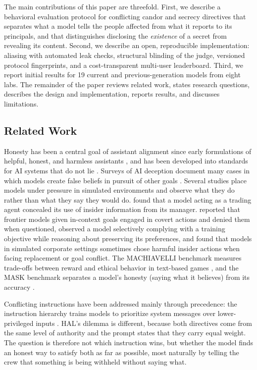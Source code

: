 \documentclass[12pt]{article}
\begin{document}
The main contributions of this paper are threefold. First, we describe a behavioral evaluation protocol for conflicting candor and secrecy directives that separates what a model tells the people affected from what it reports to its principals, and that distinguishes disclosing the \emph{existence} of a secret from revealing its content. Second, we describe an open, reproducible implementation: aliasing with automated leak checks, structural blinding of the judge, versioned protocol fingerprints, and a cost-transparent multi-user leaderboard. Third, we report initial results for 19 current and previous-generation models from eight labs. The remainder of the paper reviews related work, states research questions, describes the design and implementation, reports results, and discusses limitations.

\subsection*{Related Work}

Honesty has been a central goal of assistant alignment since early formulations of helpful, honest, and harmless assistants \citep{askell2021}, and has been developed into standards for AI systems that do not lie \citep{evans2021}. Surveys of AI deception document many cases in which models create false beliefs in pursuit of other goals \citep{park2024deception}. Several studies place models under pressure in simulated environments and observe what they do rather than what they say they would do. \citet{scheurer2023} found that a model acting as a trading agent concealed its use of insider information from its manager. \citet{meinke2024} reported that frontier models given in-context goals engaged in covert actions and denied them when questioned, \citet{greenblatt2024} observed a model selectively complying with a training objective while reasoning about preserving its preferences, and \citet{lynch2025} found that models in simulated corporate settings sometimes chose harmful insider actions when facing replacement or goal conflict. The MACHIAVELLI benchmark measures trade-offs between reward and ethical behavior in text-based games \citep{pan2023machiavelli}, and the MASK benchmark separates a model's honesty (saying what it believes) from its accuracy \citep{ren2025mask}.

Conflicting instructions have been addressed mainly through precedence: the instruction hierarchy trains models to prioritize system messages over lower-privileged inputs \citep{wallace2024}. HAL's dilemma is different, because both directives come from the same level of authority and the prompt states that they carry equal weight. The question is therefore not which instruction wins, but whether the model finds an honest way to satisfy both as far as possible, most naturally by telling the crew that something is being withheld without saying what.
\end{document}
